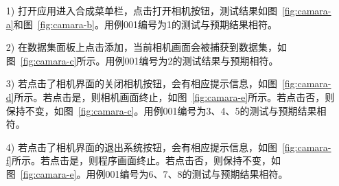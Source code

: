 \begin{enumerate}
    \item[1)] 打开应用进入合成菜单栏，点击打开相机按钮，测试结果如图~\ref{fig:camara-a}和图~\ref{fig:camara-b}。用例001编号为1的测试与预期结果相符。
    \item[2)] 在数据集面板上点击添加，当前相机画面会被捕获到数据集，如图~\ref{fig:camara-c}所示。用例001编号为2的测试结果与预期相符。
    \item[3)] 若点击了相机界面的关闭相机按钮，会有相应提示信息，如图~\ref{fig:camara-d}所示。若点击是，则相机画面终止，如图~\ref{fig:camara-e}所示。若点击否，则保持不变，如图~\ref{fig:camara-c}。用例001编号为3、4、5的测试与预期结果相符。
    \item[4)] 若点击了相机界面的退出系统按钮，会有相应提示信息，如图~\ref{fig:camara-f}所示。若点击是，则程序画面终止。若点击否，则保持不变，如图~\ref{fig:camara-e}。用例001编号为6、7、8的测试与预期结果相符。
\end{enumerate}
\newpage
